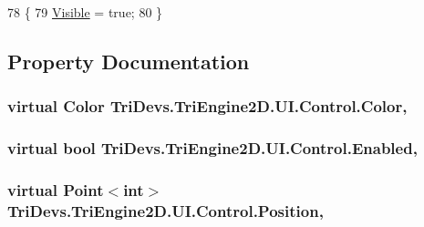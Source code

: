 \begin{DoxyCode}
78         \{
79             \hyperlink{class_tri_devs_1_1_tri_engine2_d_1_1_u_i_1_1_control_acecae44ceb3fa79d765f8f49b29fbaa8}{Visible} = \textcolor{keyword}{true};
80         \}
\end{DoxyCode}


\subsection{Property Documentation}
\hypertarget{class_tri_devs_1_1_tri_engine2_d_1_1_u_i_1_1_control_a0fd69d349a7ef225ac6273c0a206356a}{
\subsubsection[{Color}]{\setlength{\rightskip}{0pt plus 5cm}virtual {\bf Color} Tri\-Devs.\-Tri\-Engine2\-D.\-U\-I.\-Control.\-Color\hspace{0.3cm}{\ttfamily [get]}, {\ttfamily [set]}}}\label{class_tri_devs_1_1_tri_engine2_d_1_1_u_i_1_1_control_a0fd69d349a7ef225ac6273c0a206356a}
\hypertarget{class_tri_devs_1_1_tri_engine2_d_1_1_u_i_1_1_control_a662c990a4fec19ac7c6c1a1a01648c77}{
\subsubsection[{Enabled}]{\setlength{\rightskip}{0pt plus 5cm}virtual bool Tri\-Devs.\-Tri\-Engine2\-D.\-U\-I.\-Control.\-Enabled\hspace{0.3cm}{\ttfamily [get]}, {\ttfamily [set]}}}\label{class_tri_devs_1_1_tri_engine2_d_1_1_u_i_1_1_control_a662c990a4fec19ac7c6c1a1a01648c77}
\hypertarget{class_tri_devs_1_1_tri_engine2_d_1_1_u_i_1_1_control_af0c36c7173572c359c6e3b7a79346c65}{
\subsubsection[{Position}]{\setlength{\rightskip}{0pt plus 5cm}virtual Point$<$int$>$ Tri\-Devs.\-Tri\-Engine2\-D.\-U\-I.\-Control.\-Position\hspace{0.3cm}{\ttfamily [get]}, {\ttfamily [set]}}}\label{class_tri_devs_1_1_tri_engine2_d_1_1_u_i_1_1_control_af0c36c7173572c359c6e3b7a79346c65}
